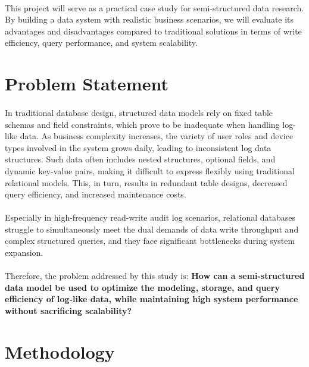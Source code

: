 \documentclass{article}
\begin{document}
\paragraph{} This project will serve as a practical case study for semi-structured data research. By building a data system with realistic business scenarios, we will evaluate its advantages and disadvantages compared to traditional solutions in terms of write efficiency, query performance, and system scalability.

\section{Problem Statement}

\paragraph{}In traditional database design, structured data models rely on fixed table schemas and field constraints, which prove to be inadequate when handling log-like data. As business complexity increases, the variety of user roles and device types involved in the system grows daily, leading to inconsistent log data structures. Such data often includes nested structures, optional fields, and dynamic key-value pairs, making it difficult to express flexibly using traditional relational models. This, in turn, results in redundant table designs, decreased query efficiency, and increased maintenance costs.

\paragraph{}Especially in high-frequency read-write audit log scenarios, relational databases struggle to simultaneously meet the dual demands of data write throughput and complex structured queries, and they face significant bottlenecks during system expansion.

\paragraph{}Therefore, the problem addressed by this study is: \textbf{How can a semi-structured data model be used to optimize the modeling, storage, and query efficiency of log-like data, while maintaining high system performance without sacrificing scalability?}

\section{Methodology}
\end{document}
